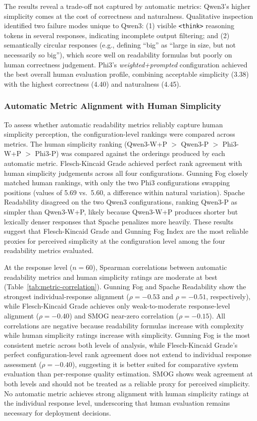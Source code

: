 \documentclass[10pt, a4paper]{article}
\let\oldtexttt\texttt
\renewcommand{\texttt}[1]{{\small\oldtexttt{#1}}}
\begin{document}
The results reveal a trade-off not captured by automatic metrics: Qwen3's higher simplicity comes at the cost of correctness and naturalness. Qualitative inspection identified two failure modes unique to Qwen3: (1) visible \texttt{<think>} reasoning tokens in several responses, indicating incomplete output filtering; and (2) semantically circular responses (e.g., defining ``big'' as ``large in size, but not necessarily so big''), which score well on readability formulas but poorly on human correctness judgement. Phi3's \textit{weighted+prompted} configuration achieved the best overall human evaluation profile, combining acceptable simplicity (3.38) with the highest correctness (4.40) and naturalness (4.45).

\subsubsection{Automatic Metric Alignment with Human Simplicity}

To assess whether automatic readability metrics reliably capture human simplicity perception, the configuration-level rankings were compared across metrics. The human simplicity ranking (Qwen3-W+P $>$ Qwen3-P $>$ Phi3-W+P $>$ Phi3-P) was compared against the orderings produced by each automatic metric. Flesch-Kincaid Grade achieved perfect rank agreement with human simplicity judgements across all four configurations. Gunning Fog closely matched human rankings, with only the two Phi3 configurations swapping positions (values of 5.69 vs.\ 5.60, a difference within natural variation). Spache Readability disagreed on the two Qwen3 configurations, ranking Qwen3-P as simpler than Qwen3-W+P, likely because Qwen3-W+P produces shorter but lexically denser responses that Spache penalizes more heavily. These results suggest that Flesch-Kincaid Grade and Gunning Fog Index are the most reliable proxies for perceived simplicity at the configuration level among the four readability metrics evaluated.

At the response level ($n=60$), Spearman correlations between automatic readability metrics and human simplicity ratings are moderate at best (Table~\ref{tab:metric-correlation}). Gunning Fog and Spache Readability show the strongest individual-response alignment ($\rho = -0.53$ and $\rho = -0.51$, respectively), while Flesch-Kincaid Grade achieves only weak-to-moderate response-level alignment ($\rho = -0.40$) and SMOG near-zero correlation ($\rho = -0.15$). All correlations are negative because readability formulas increase with complexity while human simplicity ratings increase with simplicity. Gunning Fog is the most consistent metric across both levels of analysis, while Flesch-Kincaid Grade's perfect configuration-level rank agreement does not extend to individual response assessment ($\rho = -0.40$), suggesting it is better suited for comparative system evaluation than per-response quality estimation. SMOG shows weak agreement at both levels and should not be treated as a reliable proxy for perceived simplicity. No automatic metric achieves strong alignment with human simplicity ratings at the individual response level, underscoring that human evaluation remains necessary for deployment decisions.
\end{document}
